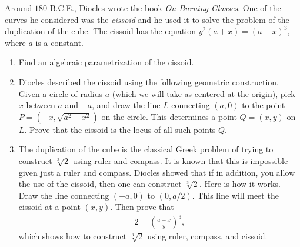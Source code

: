 \begin{exercise}{10}
    Around $180$ B.C.E., Diocles wrote the book \emph{On Burning-Glasses}. 
    One of the curves he considered was the \emph{cissoid} and he used it to solve the problem of the duplication of the cube. 
    The cissoid has the equation $y^2 (a+x) = (a-x)^3$, where $a$ is a constant. 
    \begin{enumerate}
        \item Find an algebraic parametrization of the cissoid.
        \item Diocles described the cissoid using the following geometric construction. 
        Given a circle of radius $a$ (which we will take as centered at the origin), pick $x$ between $a$ and $-a$, and draw the line $L$ connecting $(a,0)$ to the point $P = (-x,\sqrt{a^2 - x^2})$ on the circle. 
        This determines a point $Q = (x,y)$ on $L$. 
        Prove that the cissoid is the locus of all such points $Q$.
        \item The duplication of the cube is the classical Greek problem of trying to construct $\sqrt[3]{2}$ using ruler and compass. 
        It is known that this is impossible given just a ruler and compass. 
        Diocles showed that if in addition, you allow the use of the cissoid, then one can construct $\sqrt[3]{2}$. 
        Here is how it works. 
        Draw the line connecting $(-a,0)$ to $(0,a/2)$. 
        This line will meet the cissoid at a point $(x,y)$. 
        Then prove that
        \begin{align*}
            2 = \left(\frac{a-x}{y}\right)^3,
        \end{align*}
         which shows how to construct $\sqrt[3]{2}$ using ruler, compass, and cissoid.
    \end{enumerate}
\end{exercise}
